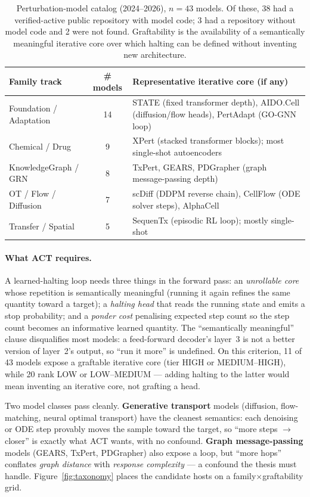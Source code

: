 \documentclass[11pt]{article}
\begin{document}
\begin{table}[t]
\centering
\caption{Perturbation-model catalog (2024--2026), $n=43$ models. Of these, 38 had a
verified-active public repository with model code; 3 had a repository without model code and 2
were not found. Graftability is the availability of a semantically meaningful iterative core over
which halting can be defined without inventing new architecture.}
\label{tab:catalog}
\begin{tabular}{lcp{7.2cm}}
\toprule
\textbf{Family track} & \textbf{\# models} & \textbf{Representative iterative core (if any)} \\
\midrule
Foundation / Adaptation & 14 & STATE (fixed transformer depth), AIDO.Cell (diffusion/flow heads), PertAdapt (GO-GNN loop) \\
Chemical / Drug         & 9  & XPert (stacked transformer blocks); most single-shot autoencoders \\
KnowledgeGraph / GRN    & 8  & TxPert, GEARS, PDGrapher (graph message-passing depth) \\
OT / Flow / Diffusion   & 7  & scDiff (DDPM reverse chain), CellFlow (ODE solver steps), AlphaCell \\
Transfer / Spatial      & 5  & SequenTx (episodic RL loop); mostly single-shot \\
\bottomrule
\end{tabular}
\end{table}

\paragraph{What ACT requires.} A learned-halting loop needs three things in the forward pass: an
\emph{unrollable core} whose repetition is semantically meaningful (running it again refines the
same quantity toward a target); a \emph{halting head} that reads the running state and emits a
stop probability; and a \emph{ponder cost} penalising expected step count so the step count
becomes an informative learned quantity. The ``semantically meaningful'' clause disqualifies most
models: a feed-forward decoder's layer~3 is not a better version of layer~2's output, so
``run it more'' is undefined. On this criterion, 11 of 43 models expose a graftable iterative
core (tier HIGH or MEDIUM--HIGH), while 20 rank LOW or LOW--MEDIUM --- adding halting to the
latter would mean inventing an iterative core, not grafting a head.

Two model classes pass cleanly. \textbf{Generative transport} models (diffusion, flow-matching,
neural optimal transport) have the cleanest semantics: each denoising or ODE step provably moves
the sample toward the target, so ``more steps $\rightarrow$ closer'' is exactly what ACT wants,
with no confound. \textbf{Graph message-passing} models (GEARS, TxPert, PDGrapher) also expose a
loop, but ``more hops'' conflates \emph{graph distance} with \emph{response complexity} --- a
confound the thesis must handle. Figure~\ref{fig:taxonomy} places the candidate hosts on a
family$\times$graftability grid.
\end{document}
